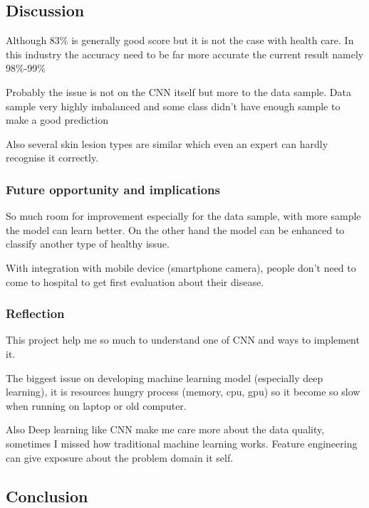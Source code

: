 \documentclass[11pt]{article}
\begin{document}
    \subsection{Discussion}\label{discussion}

Although 83\% is generally good score but it is not the case with health
care. In this industry the accuracy need to be far more accurate the
current result namely 98\%-99\%

Probably the issue is not on the CNN itself but more to the data sample.
Data sample very highly imbalanced and some class didn't have enough
sample to make a good prediction

Also several skin lesion types are similar which even an expert can
hardly recognise it correctly.

\subsubsection{Future opportunity and
implications}\label{future-opportunity-and-implications}

So much room for improvement especially for the data sample, with more
sample the model can learn better. On the other hand the model can be
enhanced to classify another type of healthy issue.

With integration with mobile device (smartphone camera), people don't
need to come to hospital to get first evaluation about their disease.

\subsubsection{Reflection}\label{reflection}

This project help me so much to understand one of CNN and ways to
implement it.

The biggest issue on developing machine learning model (especially deep
learning), it is resources hungry process (memory, cpu, gpu) so it
become so slow when running on laptop or old computer.

Also Deep learning like CNN make me care more about the data quality,
sometimes I missed how traditional machine learning works. Feature
engineering can give exposure about the problem domain it self.

    \subsection{Conclusion}\label{conclusion}
\end{document}
